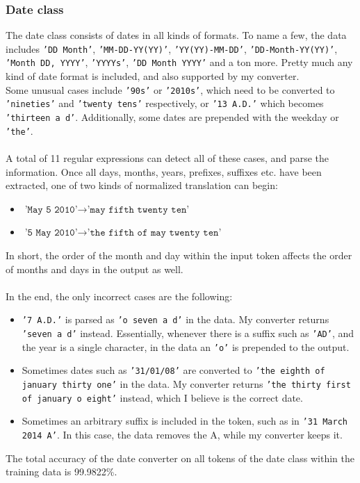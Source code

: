 \documentclass[a4paper, 9pt]{extarticle}
\newcommand{\str}[1]{\texttt{'#1'}}
\begin{document}
\subsubsection{Date class}
The date class consists of dates in all kinds of formats. To name a few, the data includes \str{DD Month}, \str{MM-DD-YY(YY)}, \str{YY(YY)-MM-DD}, \str{DD-Month-YY(YY)}, \str{Month DD, YYYY}, \str{YYYYs}, \str{DD Month YYYY} and a ton more. Pretty much any kind of date format is included, and also supported by my converter.\\
Some unusual cases include \str{90s} or \str{2010s}, which need to be converted to \str{nineties} and \str{twenty tens} respectively, or \str{13 A.D.} which becomes \str{thirteen a d}. Additionally, some dates are prepended with the weekday or \str{the}.\\
\\
A total of 11 regular expressions can detect all of these cases, and parse the information. Once all days, months, years, prefixes, suffixes etc. have been extracted, one of two kinds of normalized translation can begin:
\begin{itemize}
    \itemsep-0.3em
    \item $\str{May 5 2010} \to \str{may fifth twenty ten}$
    \item $\str{5 May 2010} \to \str{the fifth of may twenty ten}$
\end{itemize}
In short, the order of the month and day within the input token affects the order of months and days in the output as well.\\
\\
In the end, the only incorrect cases are the following:
\begin{itemize}
    \itemsep-0.3em
    \item \str{7 A.D.} is parsed as \str{o seven a d} in the data. My converter returns \str{seven a d} instead. Essentially, whenever there is a suffix such as \str{AD}, and the year is a single character, in the data an \str{o} is prepended to the output.
    \item Sometimes dates such as \str{31/01/08} are converted to \str{the eighth of january thirty one} in the data. My converter returns \str{the thirty first of january o eight} instead, which I believe is the correct date.
    \item Sometimes an arbitrary suffix is included in the token, such as in \str{31 March 2014 A}. In this case, the data removes the A, while my converter keeps it.
\end{itemize}
The total accuracy of the date converter on all tokens of the date class within the training data is 99.9822\%.
\end{document}
